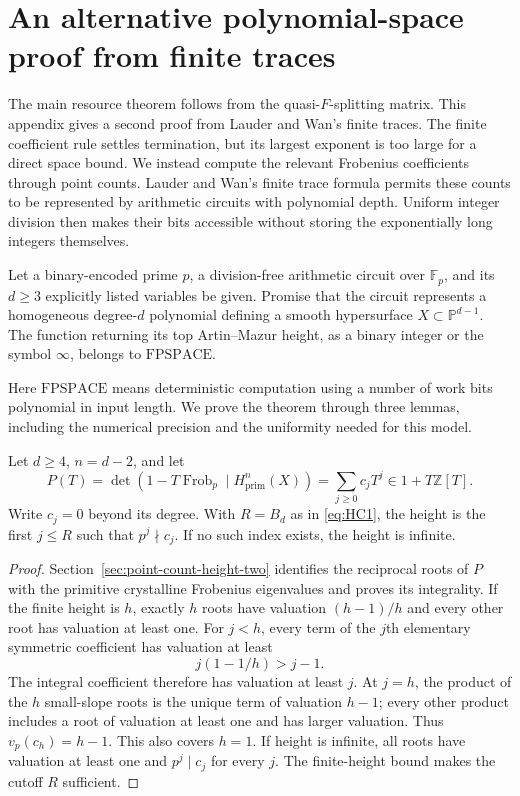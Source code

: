 \section{An alternative polynomial-space proof from finite traces}
\label{subsec:height-polynomial-space}
The main resource theorem follows from the quasi-$F$-splitting matrix. This appendix gives a second proof from Lauder and Wan's finite traces. The finite coefficient rule settles termination, but its largest exponent is too large for a direct space bound. We instead compute the relevant Frobenius coefficients through point counts. Lauder and Wan's finite trace formula permits these counts to be represented by arithmetic circuits with polynomial depth. Uniform integer division then makes their bits accessible without storing the exponentially long integers themselves.

\begin{theorem}
\label{thm:height-polynomial-space}
Let a binary-encoded prime $p$, a division-free arithmetic circuit over $\mathbb F_p$, and its $d\ge3$ explicitly listed variables be given. Promise that the circuit represents a homogeneous degree-$d$ polynomial defining a smooth hypersurface $X\subset\mathbb P^{d-1}$. The function returning its top Artin--Mazur height, as a binary integer or the symbol $\infty$, belongs to $\mathrm{FPSPACE}$.
\end{theorem}

Here $\mathrm{FPSPACE}$ means deterministic computation using a number of work bits polynomial in input length. We prove the theorem through three lemmas, including the numerical precision and the uniformity needed for this model.

\begin{lemma}
\label{lem:height-first-frobenius-coefficient}
Let $d\ge4$, $n=d-2$, and let
\[
 P(T)=\det(1-T\operatorname{Frob}_p\mid H^n_{\mathrm{prim}}(X))
      =\sum_{j\ge0}c_jT^j\in1+T\mathbb Z[T].
\]
Write $c_j=0$ beyond its degree. With $R=B_d$ as in \eqref{eq:HC1}, the height is the first $j\le R$ such that $p^j\nmid c_j$. If no such index exists, the height is infinite.
\end{lemma}
\begin{proof}
Section~\ref{sec:point-count-height-two} identifies the reciprocal roots of $P$ with the primitive crystalline Frobenius eigenvalues and proves its integrality. If the finite height is $h$, exactly $h$ roots have valuation $(h-1)/h$ and every other root has valuation at least one. For $j<h$, every term of the $j$th elementary symmetric coefficient has valuation at least
\[
 j(1-1/h)>j-1.
\]
The integral coefficient therefore has valuation at least $j$. At $j=h$, the product of the $h$ small-slope roots is the unique term of valuation $h-1$; every other product includes a root of valuation at least one and has larger valuation. Thus $v_p(c_h)=h-1$. This also covers $h=1$. If height is infinite, all roots have valuation at least one and $p^j\mid c_j$ for every $j$. The finite-height bound makes the cutoff $R$ sufficient.
\end{proof}

